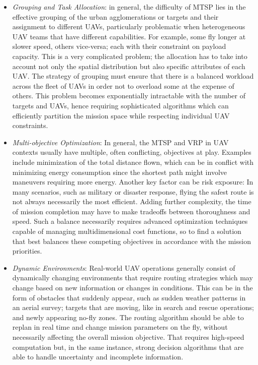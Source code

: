 \documentclass[conference]{IEEEtran}
\begin{document}
\begin{itemize}
    \item \textit{Grouping and Task Allocation}: in general, the difficulty of MTSP lies in the effective grouping of the urban agglomerations or targets and their assignment to different UAVs, particularly problematic when heterogeneous UAV teams that have different capabilities. For example, some fly longer at slower speed, others vice-versa; each with their constraint on payload capacity. This is a very complicated problem; the allocation has to take into account not only the spatial distribution but also specific attributes of each UAV. The strategy of grouping must ensure that there is a balanced workload across the fleet of UAVs in order not to overload some at the expense of others. This problem becomes exponentially intractable with the number of targets and UAVs, hence requiring sophisticated algorithms which can efficiently partition the mission space while respecting individual UAV constraints.

    \item \textit{Multi-objective Optimization}: In general, the MTSP and VRP in UAV contexts usually have multiple, often conflicting, objectives at play. Examples include minimization of the total distance flown, which can be in conflict with minimizing energy consumption since the shortest path might involve maneuvers requiring more energy. Another key factor can be risk exposure: In many scenarios, such as military or disaster response, flying the safest route is not always necessarily the most efficient. Adding further complexity, the time of mission completion may have to make tradeoffs between thoroughness and speed. Such a balance necessarily requires advanced optimization techniques capable of managing multidimensional cost functions, so to find a solution that best balances these competing objectives in accordance with the mission priorities.

    \item \textit{Dynamic Environments}: Real-world UAV operations generally consist of dynamically changing environments that require routing strategies which may change based on new information or changes in conditions. This can be in the form of obstacles that suddenly appear, such as sudden weather patterns in an aerial survey; targets that are moving, like in search and rescue operations; and newly appearing no-fly zones. The routing algorithm should be able to replan in real time and change mission parameters on the fly, without necessarily affecting the overall mission objective. That requires high-speed computation but, in the same instance, strong decision algorithms that are able to handle uncertainty and incomplete information.


\end{itemize}
\end{document}
